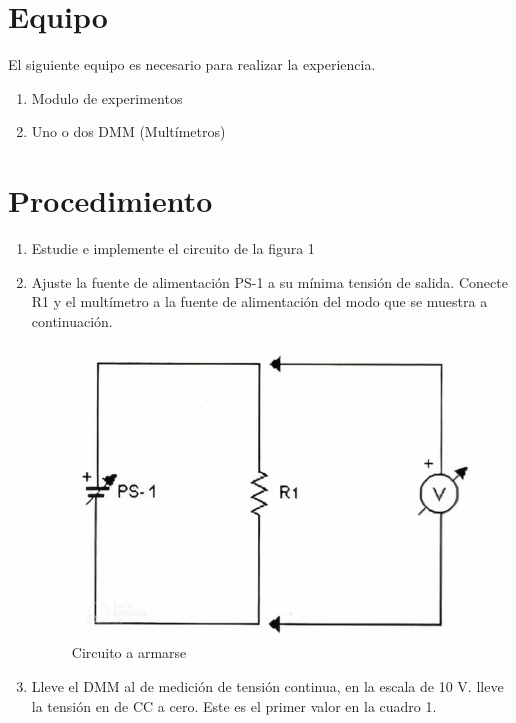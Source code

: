 \section{Equipo}
El siguiente equipo es necesario para realizar la experiencia.
\begin{enumerate}
	\item Modulo de experimentos
	\item Uno o dos DMM (Multímetros)
\end{enumerate} 
\section{Procedimiento}
\begin{enumerate}
	\item Estudie e implemente el circuito de la figura 1
	\item Ajuste la fuente de alimentación PS-1 a su mínima tensión de salida. Conecte R1 y el multímetro a la fuente de alimentación del modo que se muestra a continuación.
	
	\begin{figure}[h]
		\centering
		\includegraphics[scale=0.5]{imagenes/4.1}
		\caption{Circuito a armarse}
	\end{figure}
	\item Lleve el DMM al de medición de tensión continua, en la escala de 10 V. lleve la tensión en de CC a cero. Este es el primer valor en la cuadro 1.
	\\
\begin{table}[htbp]
	\centering
	

\end{table}
\end{enumerate}
